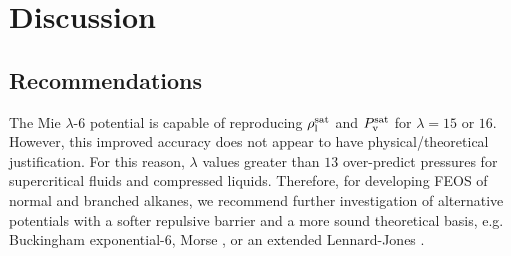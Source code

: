 \documentclass[journal=jctc,manuscript=article]{achemso}
\begin{document}

\section{Discussion} \label{Discussion} 

\subsection{Recommendations} \label{Recommendations}

The Mie $\lambda$-6 potential is capable of reproducing $\rho_{\rm l}^{\rm sat}$ and $P_{\rm v}^{\rm sat}$ for $\lambda = 15$ or $16$. However, this improved accuracy does not appear to have physical/theoretical justification. For this reason, $\lambda$ values greater than $13$ over-predict pressures for supercritical fluids and compressed liquids. Therefore, for developing FEOS of normal and branched alkanes, we 
recommend further investigation of alternative potentials with a softer repulsive barrier and a more sound theoretical basis, e.g. Buckingham exponential-6, Morse \cite{Rowley1999,Rowley2001,Hayes2004}, or an extended Lennard-Jones \cite{Mostafa_Diss,Hajigeorgiou2016,Kalos1972}.
\end{document}
